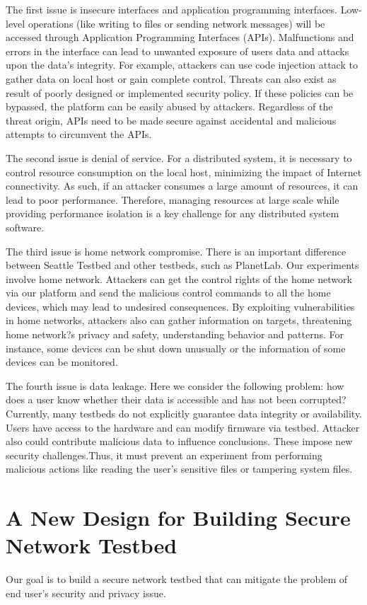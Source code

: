 \documentclass[11pt, oneside]{article}   	%
\begin{document}
The first issue is insecure interfaces and application programming interfaces. Low-level operations (like writing to files or sending network messages) will be accessed through Application Programming Interfaces (APIs). Malfunctions and errors in the interface can lead to unwanted exposure of users data and attacks upon the data's integrity. For example, attackers can use code injection attack to gather data on local host or gain complete control. Threats can also exist as result of  poorly designed or implemented security policy. If these policies can be bypassed, the platform can be easily abused by attackers. Regardless of the threat origin, APIs need to be made secure against accidental and malicious attempts to circumvent the APIs.

The second issue is denial of service. For a distributed system, it is necessary to control resource consumption on the local host, minimizing the impact of Internet connectivity. As such, if an attacker consumes a large amount of resources, it can lead to poor performance. Therefore, managing resources at large scale while providing performance isolation is a key challenge for any distributed system software.

The third issue is home network compromise. There is an important difference between Seattle Testbed and other testbeds, such as PlanetLab. Our experiments involve home network. Attackers can get the control rights of the home network via our platform and send the malicious control commands to all the home devices, which may lead to undesired consequences. By exploiting vulnerabilities in home networks, attackers also can gather information on targets, threatening home network?s privacy and safety, understanding behavior and patterns. For instance, some devices can be shut down unusually or the information of some devices can be monitored.

The fourth issue is data leakage. Here we consider the following problem: how does a user know whether their data is accessible and has not been corrupted? Currently, many testbeds do not explicitly guarantee data integrity or availability. Users have access to the hardware and can modify firmware via testbed. Attacker also could contribute malicious data to influence conclusions. These impose new security challenges.Thus, it must prevent an experiment from performing malicious actions like reading the user's sensitive files or tampering system files.

\section{A New Design for Building Secure Network Testbed}
\label{sec.design}
Our goal is to build a secure network testbed that can mitigate the problem of end user's security and privacy issue. 
\end{document}
